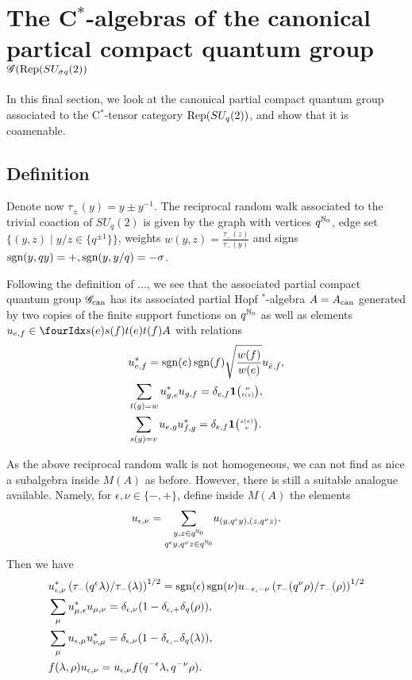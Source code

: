 \section{The C$^*$-algebras of the canonical partical compact quantum group $\mathscr{G}(\mathrm{Rep}(SU_{\sigma q}(2))$}\label{SecUni}

In this final section, we look at the canonical partial compact quantum group associated to the C$^*$-tensor category $\mathrm{Rep}(SU_q(2))$, and show that it is coamenable.

\subsection{Definition}

Denote now $\tau_{\pm}(y) = y\pm y^{-1}$. The reciprocal random walk associated to the trivial coaction of $SU_q(2)$ is given by the graph with vertices $q^{\mathbb{N}_0}$, edge set $\{(y,z)\mid y/z \in \{q^{\pm 1}\}\}$, weights $w(y,z) = \frac{\tau_-(z)}{\tau_-(y)}$ and signs $\operatorname{\mathrm{sgn}}(y,qy) = +, \operatorname{\mathrm{sgn}}(y,y/q) = -\sigma$.

Following the definition of ..., we see that the associated partial compact quantum group $\mathscr{G}_{\operatorname{\mathrm{can}}}$ has its associated partial Hopf $^*$-algebra $A =A_{\operatorname{\mathrm{can}}}$ generated by two copies of the finite support functions on $q^{\mathbb{N}_0}$ as well as elements $u_{e,f} \in \Gr{A}{s(e)}{t(e)}{s(f)}{t(f)}$ with relations \begin{align*} &u_{e,f}^* = \operatorname{\mathrm{sgn}}(e)\operatorname{\mathrm{sgn}}(f) \sqrt{\frac{w(f)}{w(e)}}u_{\bar{e},\bar{f}},\\ &\sum_{t(g) = w} u_{g,e}^* u_{g,f} = \delta_{e,f} \mathbf{1}{\tiny {\begin{pmatrix} w\\t(e)\end{pmatrix}}},\\  &\sum_{s(g) = v} u_{e,g}u_{f,g}^* = \delta_{e,f} \mathbf{1}{\tiny {\begin{pmatrix} s(e)\\v\end{pmatrix}}}.\end{align*} 

As the above reciprocal random walk is not homogeneous, we can not find as nice a subalgebra inside $M(A)$ as before. However, there is still a suitable analogue available. Namely, for $\epsilon,\nu \in \{-,+\}$, define inside $M(A)$ the elements \[u_{\epsilon,\nu} =\underset{q^{\epsilon}y,q^{\nu}z \in q^{\mathbb{N}_0}}{ \sum_{y,z\in q^{\mathbb{N}_0}}} u_{(y,q^{\epsilon}y),(z,q^{\nu}z)}.\] Then we have \begin{align*}
& u_{\epsilon,\nu}^* \left(\tau_-(q^{\epsilon}\lambda)/\tau_-(\lambda)\right)^{1/2} = \operatorname{\mathrm{sgn}}(\epsilon)\operatorname{\mathrm{sgn}}(\nu) u_{-\epsilon,-\nu}\left(\tau_-(q^{\nu}\rho)/\tau_-(\rho)\right)^{1/2} \\
&\sum_{\mu} u_{\mu,\epsilon}^* u_{\mu,\nu} = \delta_{\epsilon,\nu}(1- \delta_{\epsilon,+}\delta_{q}(\rho)),\\ &\sum_{\mu} u_{\epsilon,\mu}u_{\nu,\mu}^* = \delta_{\epsilon,\nu}(1-\delta_{\epsilon,-}\delta_{q}(\lambda)), \\& f(\lambda,\rho) u_{\epsilon,\nu} = u_{\epsilon,\nu}f(q^{-\epsilon}\lambda,q^{-\nu}\rho).\end{align*}

